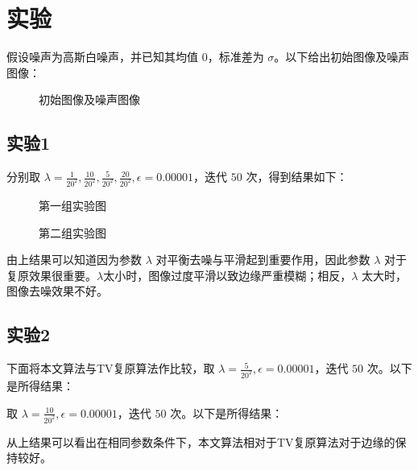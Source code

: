 \section{实验}
假设噪声为高斯白噪声，并已知其均值 $0$，标准差为 $\sigma$。以下给出初始图像及噪声图像：
\begin{figure}[H]
\centering
\subfigure[原始图像]{\label{figure:001} \texttt{[image: 001]}}
\subfigure[噪声图像（$\mu=0,\sigma=20$)]{\label{figure:002} \texttt{[image: 002]}}
\caption{初始图像及噪声图像}
\end{figure}

\subsection{实验1}
分别取 $\lambda=\frac{1}{20^2},\frac{10}{20^2},\frac{5}{20^2},\frac{20}{20^2},\epsilon=0.00001$，迭代 $50$ 次，得到结果如下：
\begin{figure}[H]
\centering
\subfigure[$\lambda=\frac{1}{20^2}$]{\label{figure:1/20} \texttt{[image: 003]}}
\subfigure[$\lambda=\frac{5}{20^2}$]{\label{figure:5/20} \texttt{[image: 004]}}
\caption{第一组实验图}
\end{figure}
\begin{figure}[H]
\centering
\subfigure[$\lambda=\frac{10}{20^2}$]{\label{figure:10/20} \texttt{[image: 005]}}
\subfigure[$\lambda=\frac{20}{20^2}$]{\label{figure:20/20} \texttt{[image: 006]}}
\caption{第二组实验图}
\end{figure}
由上结果可以知道因为参数 $\lambda$ 对平衡去噪与平滑起到重要作用，因此参数 $\lambda$ 对于复原效果很重要。$\lambda$太小时，图像过度平滑以致边缘严重模糊；相反，$\lambda$ 太大时，图像去噪效果不好。
\subsection{实验2}
下面将本文算法与TV复原算法作比较，取 $\lambda=\frac{5}{20^2},\epsilon=0.00001$，迭代 $50$ 次。以下是所得结果：
\begin{figure}[H]
\centering
\subfigure[本文算法所得结果]{\label{figure:1/2} \texttt{[image: 007]}}
\subfigure[TV复原算法所得结果]{\label{figure:1} \texttt{[image: 008]}}
\end{figure}
取 $\lambda=\frac{10}{20^2},\epsilon=0.00001$，迭代 $50$ 次。以下是所得结果：
\begin{figure}[H]
\centering
\subfigure[本文算法所得结果]{\label{figure:1/2} \texttt{[image: 009]}}
\subfigure[TV复原算法所得结果]{\label{figure:1} \texttt{[image: 010]}}
\end{figure}
从上结果可以看出在相同参数条件下，本文算法相对于TV复原算法对于边缘的保持较好。



